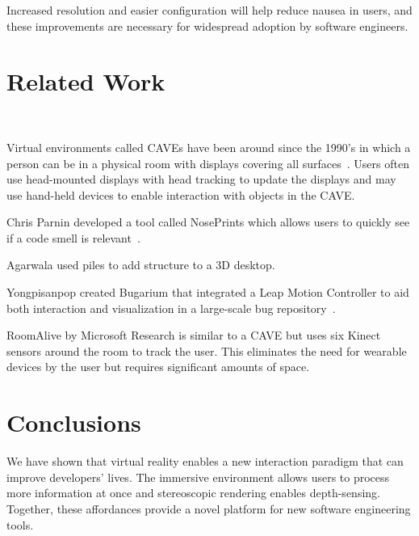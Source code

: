 \documentclass[conference]{IEEEtran}
\begin{document}
Increased resolution and easier configuration will help reduce nausea in users, and these improvements are necessary for widespread adoption by software engineers.



\section{Related Work}

\\


Virtual environments called CAVEs have been around since the 1990's in which a person can be in a physical room with displays covering all surfaces~\cite{Cruz-Neira:CAVE}.  
Users often use head-mounted displays with head tracking to update the displays and may use hand-held devices to enable interaction with objects in the CAVE.

Chris Parnin developed a tool called NosePrints which allows users to quickly see if a code smell is relevant~\cite{parnin:Noseprints}.

Agarwala used piles to add structure to a 3D desktop.~\cite{Agarawala:BumpTop}

Yongpisanpop created Bugarium that integrated a Leap Motion Controller to aid both interaction and visualization in a large-scale bug repository~\cite{Bugarium}.

RoomAlive by Microsoft Research is similar to a CAVE but uses six Kinect sensors around the room to track the user.  This eliminates the need for wearable devices by the user but requires significant amounts of space.~\cite{Jones:RoomAlive}

\section{Conclusions}
We have shown that virtual reality enables a new interaction paradigm that can improve developers' lives. 
The immersive environment allows users to process more information at once and stereoscopic rendering enables depth-sensing. 
Together, these affordances provide a novel platform for new software engineering tools.



\end{document}
